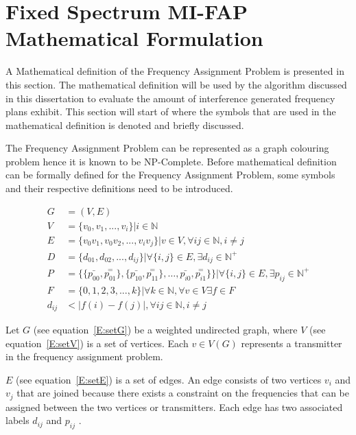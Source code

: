 \section{Fixed Spectrum MI-FAP Mathematical Formulation}
\label{sec:FAPMathDef}
A Mathematical definition of the Frequency Assignment Problem is presented in this section. The mathematical definition will be used by the algorithm discussed in this dissertation to evaluate the amount of interference generated frequency plans exhibit. This section will start of where the symbols that are used in the mathematical definition is denoted and briefly discussed.

The Frequency Assignment Problem can be represented as a graph colouring problem hence it is known to be NP-Complete. Before mathematical definition can be formally defined for the Frequency Assignment Problem, some symbols and their respective definitions need to be introduced.

\begin{align}
	G &= (V,E) \label{E:setG}\\
	V &= \{v_{0},v_{1},...,v_{i}\} | i \in \mathbb{N} \label{E:setV}\\
	E &= \{v_0v_1,v_0v_2,...,v_iv_j\}|v \in V,\forall ij \in \mathbb{N},i \neq j \label{E:setE}\\
	D &= \{d_{01},d_{02},...,d_{ij}\}| \forall\{i,j\} \in E, \exists d_{ij} \in \mathbb{N}^+ \label{E:setD}\\
	P &= \{\{\bar{p_{00}},\overset{=}{p_{01}}\},\{\bar{p_{10}},\overset{=}{p_{11}}\},\ldots,\bar{p_{i0}},\overset{=}{p_{i1}}\}\}| \forall \{i,j\} \in E,\exists p_{ij} \in \mathbb{N}^+ \label{E:setP}\\
	F &= \{0,1,2,3,...,k\}| \forall k \in \mathbb{N},\forall v \in V \exists f \in F\label{E:setF}\\
	d_{ij} &< |f(i) - f(j)|, \forall ij \in \mathbb{N},i \neq j \label{E:interference}
\end{align}

Let $G$ (see equation~\ref{E:setG}) be a weighted undirected graph, where $V$ (see equation~\ref{E:setV}) is a set of vertices. Each $v \in V(G)$ represents a transmitter in the frequency assignment problem. 

$E$ (see equation~\ref{E:setE}) is a set of edges. An edge consists of two vertices $v_i$ and $v_j$ that are joined because there exists a constraint on the frequencies that can be assigned between the two vertices or transmitters. Each edge has two associated labels $d_{ij}$ and $p_{ij}$ \cite{FAPOrientationModel,TabuMontemanniSmith}. 

